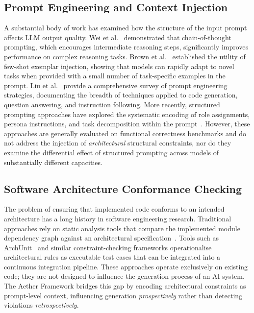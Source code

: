 \documentclass[review,12pt,3p]{elsarticle}
\begin{document}
\subsection{Prompt Engineering and Context Injection}

A substantial body of work has examined how the structure of the input prompt affects LLM
output quality. Wei et al.~\citep{Wei2022ChainOfThought} demonstrated that chain-of-thought
prompting, which encourages intermediate reasoning steps, significantly improves performance
on complex reasoning tasks. Brown et al.~\citep{Brown2020GPT3} established the utility of
few-shot exemplar injection, showing that models can rapidly adapt to novel tasks when
provided with a small number of task-specific examples in the prompt. Liu et
al.~\citep{Liu2023PromptSurvey} provide a comprehensive survey of prompt engineering
strategies, documenting the breadth of techniques applied to code generation, question
answering, and instruction following. More recently, structured prompting approaches have
explored the systematic encoding of role assignments, persona instructions, and task
decomposition within the prompt~\citep{Jiang2020StructuredPrompt}. However, these
approaches are generally evaluated on functional correctness benchmarks and do not address
the injection of \emph{architectural} structural constraints, nor do they examine the
differential effect of structured prompting across models of substantially different
capacities.

\subsection{Software Architecture Conformance Checking}

The problem of ensuring that implemented code conforms to an intended architecture has a
long history in software engineering research. Traditional approaches rely on static
analysis tools that compare the implemented module dependency graph against an architectural
specification~\citep{deGraft2009ArchConformance}. Tools such as ArchUnit~\citep{ArchUnit2021}
and similar constraint-checking frameworks operationalise architectural rules as executable
test cases that can be integrated into a continuous integration pipeline. These approaches
operate exclusively on existing code; they are not designed to influence the generation
process of an AI system. The Aether Framework bridges this gap by encoding architectural
constraints as prompt-level context, influencing generation \emph{prospectively} rather
than detecting violations \emph{retrospectively}.
\end{document}
